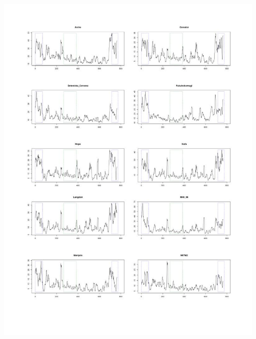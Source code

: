 \documentclass[a4paper, 12pt]{article}
\begin{document}
\begin{onehalfspace}
\begin{center}
\includegraphics[scale=0.64]{pic_Data/ane2-3.jpg}\\
\thispagestyle{empty}

\end{center}
\end{onehalfspace}
\end{document}
